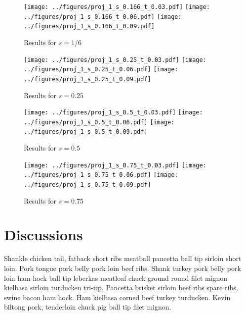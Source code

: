 \documentclass[twocolumn,10pt]{asme2ej}
\begin{document}
\begin{figure}[htb]
\begin{center}
\texttt{[image: ../figures/proj\_1\_s\_0.166\_t\_0.03.pdf]}
\texttt{[image: ../figures/proj\_1\_s\_0.166\_t\_0.06.pdf]}
\texttt{[image: ../figures/proj\_1\_s\_0.166\_t\_0.09.pdf]}
\caption{Results for $s = 1/6$}
\end{center}
\end{figure}

\begin{figure}[htb]
\begin{center}
\texttt{[image: ../figures/proj\_1\_s\_0.25\_t\_0.03.pdf]}
\texttt{[image: ../figures/proj\_1\_s\_0.25\_t\_0.06.pdf]}
\texttt{[image: ../figures/proj\_1\_s\_0.25\_t\_0.09.pdf]}
\caption{Results for $s = 0.25$}
\end{center}
\end{figure}

\begin{figure}[htb]
\begin{center}
\texttt{[image: ../figures/proj\_1\_s\_0.5\_t\_0.03.pdf]}
\texttt{[image: ../figures/proj\_1\_s\_0.5\_t\_0.06.pdf]}
\texttt{[image: ../figures/proj\_1\_s\_0.5\_t\_0.09.pdf]}
\caption{Results for $s = 0.5$}
\end{center}
\end{figure}

\begin{figure}[htb]
\begin{center}
\texttt{[image: ../figures/proj\_1\_s\_0.75\_t\_0.03.pdf]}
\texttt{[image: ../figures/proj\_1\_s\_0.75\_t\_0.06.pdf]}
\texttt{[image: ../figures/proj\_1\_s\_0.75\_t\_0.09.pdf]}
\caption{Results for $s = 0.75$}
\end{center}
\end{figure}
\section{Discussions}
Shankle chicken tail, fatback short ribs meatball pancetta ball tip sirloin short loin. Pork tongue pork belly pork loin beef ribs. Shank turkey pork belly pork loin ham hock ball tip leberkas meatloaf chuck ground round filet mignon kielbasa sirloin turducken tri-tip. Pancetta brisket sirloin beef ribs spare ribs, swine bacon ham hock. Ham kielbasa corned beef turkey turducken. Kevin biltong pork, tenderloin chuck pig ball tip filet mignon.

%
\end{document}
